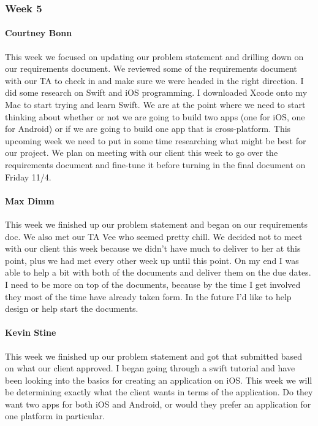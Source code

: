 		\subsubsection{Week 5}
		
			\paragraph{Courtney Bonn}
			This week we focused on updating our problem statement and drilling down on our requirements document. We reviewed some of the requirements document with our TA to check in and make sure we were headed in the right direction. I did some research on Swift and iOS programming. I downloaded Xcode onto my Mac to start trying and learn Swift. We are at the point where we need to start thinking about whether or not we are going to build two apps (one for iOS, one for Android) or if we are going to build one app that is cross-platform. This upcoming week we need to put in some time researching what might be best for our project. We plan on meeting with our client this week to go over the requirements document and fine-tune it before turning in the final document on Friday 11/4.

			\paragraph{Max Dimm}
			This week we finished up our problem statement and began on our requirements doc. We also met our TA Vee who seemed pretty chill. We decided not to meet with our client this week because we didn't have much to deliver to her at this point, plus we had met every other week up until this point. On my end I was able to help a bit with both of the documents and deliver them on the due dates. I need to be more on top of the documents, because by the time I get involved they most of the time have already taken form. In the future I'd like to help design or help start the documents.
			
			\paragraph{Kevin Stine}
			This week we finished up our problem statement and got that submitted based on what our client approved. I began going through a swift tutorial and have been looking into the basics for creating an application on iOS. This week we will be determining exactly what the client wants in terms of the application. Do they want two apps for both iOS and Android, or would they prefer an application for one platform in particular.
			
